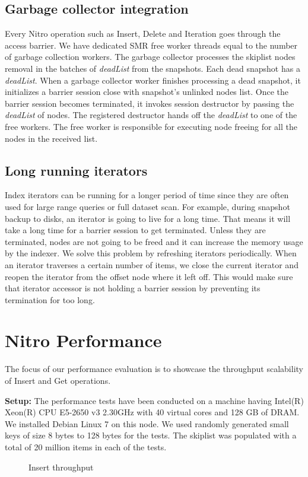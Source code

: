 \documentclass{vldb}
\begin{document}
\subsection{Garbage collector integration}
Every Nitro operation such as Insert, Delete and Iteration goes through the access barrier. We have dedicated SMR free worker threads equal to the number of garbage collection workers. The garbage collector processes the skiplist nodes removal in the batches of \textit{deadList} from the snapshots. Each dead snapshot has a \textit{deadList}. When a garbage collector worker finishes processing a dead snapshot, it initializes a barrier session close with snapshot's unlinked nodes list. Once the barrier session becomes terminated, it invokes session destructor by passing the \textit{deadList} of nodes. The registered destructor hands off the \textit{deadList} to one of the free workers. The free worker is responsible for executing node freeing for all the nodes in the received list.

\subsection{Long running iterators}
Index iterators can be running for a longer period of time since they are often used for large range queries or full dataset scan. For example, during snapshot backup to disks, an iterator is going to live for a long time. That means it will take a long time for a barrier session to get terminated. Unless they are terminated, nodes are not going to be freed and it can increase the memory usage by the indexer. We solve this problem by refreshing iterators periodically. When an iterator traverses a certain number of items, we close the current iterator and reopen the iterator from the offset node where it left off. This would make sure that iterator accessor is not holding a barrier session by preventing its termination for too long.

\section{Nitro Performance}
The focus of our performance evaluation is to showcase the throughput scalability of Insert and Get operations.

\textbf{Setup:} The performance tests have been conducted on a machine having Intel(R) Xeon(R) CPU E5-2650 v3 2.30GHz with 40 virtual cores and 128 GB of DRAM. We installed Debian Linux 7 on this node. We used randomly generated small keys of size 8 bytes to 128 bytes for the tests. The skiplist was populated with a total of 20 million items in each of the tests.
\begin{figure}[h]

\caption{Insert throughput}
\label{fig:throughput-threads}
\end{figure}
\end{document}
